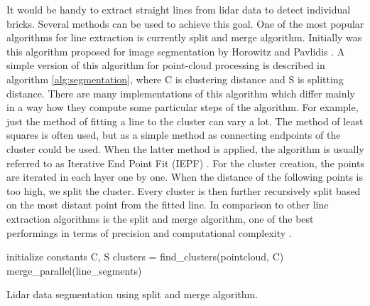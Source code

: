 It would be handy to extract straight lines from lidar data to detect individual bricks. Several methods can be used to achieve this goal. One of the most popular algorithms for line extraction is currently split and merge algorithm. Initially was this algorithm proposed for image segmentation by Horowitz and Pavlidis \cite{horowitz1976}. A simple version of this algorithm for point-cloud processing is described in algorithm \ref{alg:segmentation}, where C is clustering distance and S is splitting distance. There are many implementations of this algorithm which differ mainly in a way how they compute some particular steps of the algorithm. For example, just the method of fitting a line to the cluster can vary a lot. The method of least squares is often used, but as a simple method as connecting endpoints of the cluster could be used. When the latter method is applied, the algorithm is usually referred to as Iterative End Point Fit (IEPF) \cite{siadat1997}. For the cluster creation, the points are iterated in each layer one by one. When the distance of the following points is too high, we split the cluster. Every cluster is then further recursively split based on the most distant point from the fitted line. In comparison to other line extraction algorithms is the split and merge algorithm, one of the best performings in terms of precision and computational complexity \cite{nguyen2006}.
\begin{algorithm}[]
initialize constants C, S\;
  clusters = find\_clusters(pointcloud, C)\;
merge\_parallel(line\_segments)\;
 
 \caption{Lidar data segmentation using split and merge algorithm.}
 \label{alg:segmentation}
\end{algorithm}


